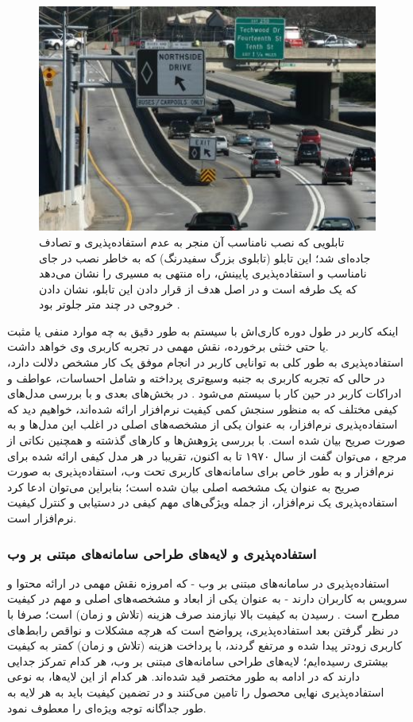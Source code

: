 \begin{figure}
	\centering\includegraphics[width=14.8cm]{Resources/tabloo.JPG}
	\caption[تابلویی که نصب نامناسب آن منجر به عدم استفاده‌پذیری و تصادف جاده‌ای شد]
	{تابلویی که نصب نامناسب آن منجر به عدم استفاده‌پذیری و تصادف جاده‌ای شد؛ این تابلو (تابلوی بزرگ سفیدرنگ) که به خاطر نصب در جای نامناسب و استفاده‌پذیری پایینش، راه منتهی به مسیری را نشان می‌دهد که یک طرفه است و در اصل هدف از قرار دادن این تابلو، نشان دادن خروجی در چند متر جلوتر بود
		\cite{noauthor_bluffton_2018}.
	}
	\label{fig:bluffton}
\end{figure}
 اینکه کاربر در طول دوره کاری‌اش با سیستم به طور دقیق به چه موارد منفی یا مثبت یا حتی خنثی برخورده، نقش مهمی در تجربه کاربری وی خواهد داشت.\\
 استفاده‌پذیری به طور کلی به توانایی کاربر در انجام موفق یک کار مشخص دلالت دارد، در حالی که تجربه کاربری به جنبه وسیع‌تری پرداخته و شامل احساسات، عواطف و ادراکات کاربر در حین کار با سیستم می‌شود
 \cite{albert_measuring_2013}.
 در بخش‌های بعدی و با بررسی مدل‌های کیفی مختلف که به منظور سنجش کمی کیفیت نرم‌افزار ارائه شده‌اند، خواهیم دید که استفاده‌پذیری نرم‌افزار، به عنوان یکی از مشخصه‌های اصلی در اغلب این مدل‌ها و به صورت صریح  بیان شده است. با بررسی پژوهش‌ها و کارهای گذشته و همچنین نکاتی از مرجع
 \cite{pressman_software_2015}،
 می‌توان گفت از سال ۱۹۷۰ تا به اکنون، تقریبا در هر مدل کیفی ارائه شده برای نرم‌افزار و به طور خاص برای سامانه‌های کاربری تحت وب، استفاده‌پذیری به صورت صریح به عنوان یک مشخصه اصلی بیان شده است؛ بنابراین می‌توان ادعا کرد استفاده‌پذیری یک نرم‌افزار، از جمله ویژگی‌های مهم کیفی در دستیابی و کنترل کیفیت نرم‌افزار است.
 \subsubsection{استفاده‌پذیری و لایه‌های طراحی سامانه‌های مبتنی بر وب}
 استفاده‌پذیری در سامانه‌های مبتنی بر وب - که امروزه نقش مهمی در ارائه محتوا و سرویس به کاربران دارند - به عنوان یکی از ابعاد و مشخصه‌های اصلی و مهم در کیفیت مطرح است
 \cite{pressman_software_2015}.
رسیدن به کیفیت بالا نیازمند صرف هزینه (تلاش و زمان) است؛ صرفا با در نظر گرفتن بعد استفاده‌پذیری، پرواضح است که هرچه مشکلات و نواقص رابط‌های کاربری زودتر پیدا شده و مرتفع گردند، با پرداخت هزینه (تلاش و زمان) کمتر به کیفیت بیشتری رسیده‌ایم؛ لایه‌های طراحی سامانه‌های مبتنی بر وب، هر کدام تمرکز جدایی دارند که در ادامه به طور مختصر قید شده‌اند. هر کدام از این لایه‌ها، به نوعی استفاده‌پذیری نهایی محصول را تامین می‌کنند و در تضمین کیفیت باید به هر لایه به طور جداگانه توجه ویژه‌ای را معطوف نمود.
